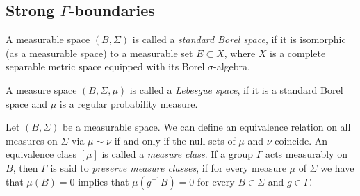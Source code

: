 \subsection{Strong \(\Gamma\)-boundaries}
\label{sec:grp-boundary}

\begin{defin}
  A measurable space \((B, \Sigma)\) is called a \emph{standard Borel space}, if it is isomorphic (as a measurable space) to a measurable set \(E \subset X\), where \(X\) is a complete separable metric space equipped with its Borel \(\sigma\)-algebra.

  A measure space \((B, \Sigma, \mu)\) is called a \emph{Lebesgue space}, if it is a standard Borel space and \(\mu\) is a regular probability measure.

  Let \((B, \Sigma)\) be a measurable space. We can define an equivalence relation on all measures on \(\Sigma\) via \(\mu \sim \nu\) if and only if the null-sets of \(\mu\) and \(\nu\) coincide. An equivalence class \([\mu]\) is called a \emph{measure class}. If a group \(\Gamma\) acts measurably on \(B\), then \(\Gamma\) is said to \emph{preserve measure classes}, if for every measure \(\mu\) of \(\Sigma\) we have that \(\mu(B) = 0\) implies that \(\mu(g^{-1} B) = 0\) for every \(B \in \Sigma\) and \(g \in \Gamma\).
\end{defin}

